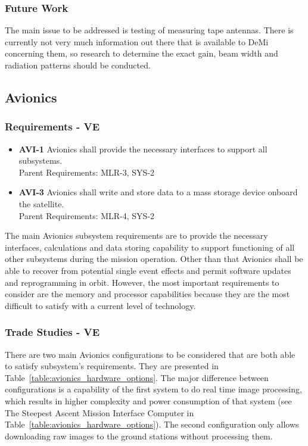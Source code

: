 \documentclass[12pt]{article}
\begin{document}
			\subsubsection{Future Work}
The main issue to be addressed is testing of measuring tape antennas. There is currently not very much information out there that is available to DeMi concerning them, so research to determine the exact gain, beam width and radiation patterns should be conducted.

\newpage
\FloatBarrier

\subsection{Avionics}

\subsubsection{Requirements - VE}
\begin{itemize}
\item \textbf{AVI-1} Avionics shall provide the necessary interfaces to support all subsystems.\\
Parent Requirements: MLR-3, SYS-2
\item \textbf{AVI-3} Avionics shall write and store data to a mass storage device onboard the satellite.\\
Parent Requirements: MLR-4, SYS-2
\end{itemize}
The main Avionics subsystem requirements are to provide the necessary interfaces, calculations and data storing capability to support functioning of all other subsystems during the mission operation. Other than that Avionics shall be able to recover from potential single event effects and permit software updates and reprogramming in orbit.
However, the most important requirements to consider are the memory and processor capabilities because they are the most difficult to satisfy with a current level of technology.

			\subsubsection{Trade Studies - VE}
There are two main Avionics configurations to be considered that are both able to satisfy subsystem’s requirements. They are presented in Table~\ref{table:avionics_hardware_options}. The major difference between configurations is a capability of the first system to do real time image processing, which results in higher complexity and power consumption of that system (see The Steepest Ascent Mission Interface Computer in Table~\ref{table:avionics_hardware_options}). The second configuration only allows downloading raw images to the ground stations without processing them.
\end{document}
